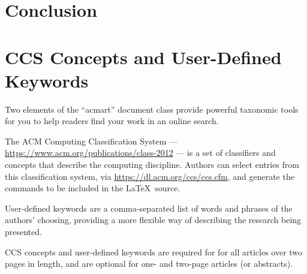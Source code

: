 \documentclass[sigconf]{acmart}
\begin{document}
\section{Conclusion}




\section{CCS Concepts and User-Defined Keywords}

Two elements of the ``acmart'' document class provide powerful
taxonomic tools for you to help readers find your work in an online
search.

The ACM Computing Classification System ---
\url{https://www.acm.org/publications/class-2012} --- is a set of
classifiers and concepts that describe the computing
discipline. Authors can select entries from this classification
system, via \url{https://dl.acm.org/ccs/ccs.cfm}, and generate the
commands to be included in the \LaTeX\ source.

User-defined keywords are a comma-separated list of words and phrases
of the authors' choosing, providing a more flexible way of describing
the research being presented.

CCS concepts and user-defined keywords are required for for all
articles over two pages in length, and are optional for one- and
two-page articles (or abstracts).
\end{document}
